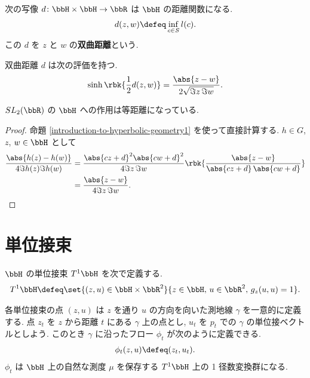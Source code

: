\documentclass[openany, a4paper, oneside]{jsbook}
\begin{document}
\begin{prop}
 次の写像 $d \colon \bbH \times \bbH \to \bbR$ は $\bbH$ の距離関数になる.
 \begin{align}
  d(z, w)
  \defeq
  \inf_{c \in S} l (c).
 \end{align}
 この $d$ を $z$ と $w$ の\textbf{双曲距離}という.
\end{prop}
\begin{prop}\label{introduction-to-hyperbolic-geometry1}
 双曲距離 $d$ は次の評価を持つ.
\begin{align}
 \sinh \rbk{\frac{1}{2} d (z, w)}
 =
 \frac{\abs{z - w}}{2 \sqrt{\Im z \, \Im w}}.
\end{align}
\end{prop}
\begin{prop}\label{introduction-to-hyperbolic-geometry2}
 $SL_2(\bbR)$ の $\bbH$ への作用は等距離になっている.
\end{prop}
\begin{proof}
命題 \ref{introduction-to-hyperbolic-geometry1} を使って直接計算する.
$h \in G$, $z$, $w \in \bbH$ として
\begin{align}
 \frac{\abs{h(z) - h(w)}}{4 \Im h(z) \Im h(w)}
 &=
 \frac{\abs{cz + d}^2 \abs{cw + d}^2}{4 \Im z \, \Im w}
  \rbk{\frac{\abs{z - w}}{\abs{cz + d} \, \abs{cw + d}}} \\
 &=
 \frac{\abs{z - w}}{4 \Im z \, \Im w}.
\end{align}
\end{proof}
\section{単位接束\label{introduction-to-hyperbolic-geometry8}}

\begin{defn}
 $\bbH$ の単位接束 $T^1 \bbH$ を次で定義する.
 \begin{align}
  T^1 \bbH
  \defeq
  \set{(z, u) \in \bbH \times \bbR^2}{z \in \bbH, \, u \in \bbR^2, \, g_z(u, u) = 1}.
 \end{align}
\end{defn}
各単位接束の点 $(z, u)$ は $z$ を通り $u$ の方向を向いた測地線 $\gamma$ を一意的に定義する.
点 $z_t$ を $z$ から距離 $t$ にある $\gamma$ 上の点とし,
$u_t$ を $p_t$ での $\gamma$ の単位接ベクトルとしよう.
このとき $\gamma$ に沿ったフロー $\phi_t$ が次のように定義できる.
\begin{align}
 \phi_t(z, u)
 \defeq
 (z_t, u_t).
\end{align}
$\phi_t$ は $\bbH$ 上の自然な測度 $\mu$ を保存する $T^1 \bbH$ 上の 1 径数変換群になる.
\end{document}
